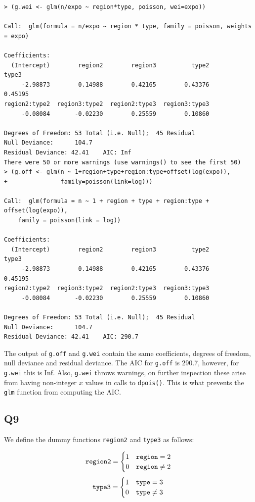 \documentclass[11pt]{article}
\begin{document}
\begin{verbatim}
> (g.wei <- glm(n/expo ~ region*type, poisson, wei=expo))

Call:  glm(formula = n/expo ~ region * type, family = poisson, weights = expo)

Coefficients:
  (Intercept)        region2        region3          type2          type3
     -2.98873        0.14988        0.42165        0.43376        0.45195
region2:type2  region3:type2  region2:type3  region3:type3  
     -0.08084       -0.02230        0.25559        0.10860  

Degrees of Freedom: 53 Total (i.e. Null);  45 Residual
Null Deviance:	    104.7 
Residual Deviance: 42.41 	AIC: Inf
There were 50 or more warnings (use warnings() to see the first 50)
> (g.off <- glm(n ~ 1+region+type+region:type+offset(log(expo)),
+               family=poisson(link=log)))

Call:  glm(formula = n ~ 1 + region + type + region:type + offset(log(expo)), 
    family = poisson(link = log))

Coefficients:
  (Intercept)        region2        region3          type2          type3
     -2.98873        0.14988        0.42165        0.43376        0.45195
region2:type2  region3:type2  region2:type3  region3:type3  
     -0.08084       -0.02230        0.25559        0.10860  

Degrees of Freedom: 53 Total (i.e. Null);  45 Residual
Null Deviance:	    104.7 
Residual Deviance: 42.41 	AIC: 290.7
\end{verbatim}

The output of \verb|g.off| and \verb|g.wei| contain the same coefficients, degrees of freedom, null deviance and residual deviance.
The AIC for \verb|g.off| is 290.7, however, for \verb|g.wei| this is Inf. Also, \verb|g.wei| throws warnings, on further inspection these arise from having non-integer $x$ values in calls to \verb|dpois()|. This is what prevents the \verb|glm| function from computing the AIC.

\subsection*{Q9}

We define the dummy functions \verb|region2| and \verb|type3| as follows:

\begin{equation}
\verb|region2| = 
\begin{cases}
	1 & \verb|region| = 2 \\
	0 & \verb|region| \neq 2
\end{cases}
\end{equation}
\begin{equation}
\verb|type3| = 
\begin{cases}
1 & \verb|type| = 3 \\
0 & \verb|type| \neq 3
\end{cases}
\end{equation}
\end{document}

